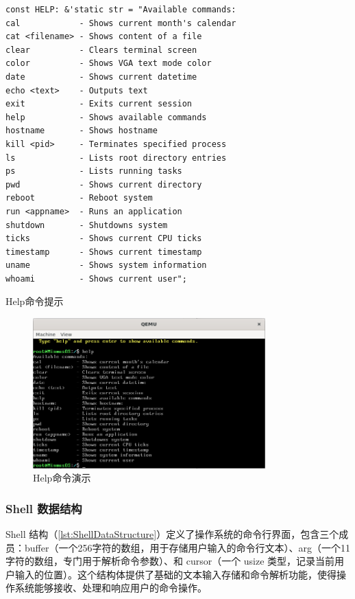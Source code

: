 \begin{listing}[htbp]
    \begin{verbatim}
const HELP: &'static str = "Available commands:
cal            - Shows current month's calendar
cat <filename> - Shows content of a file
clear          - Clears terminal screen
color          - Shows VGA text mode color
date           - Shows current datetime
echo <text>    - Outputs text
exit           - Exits current session
help           - Shows available commands
hostname       - Shows hostname
kill <pid>     - Terminates specified process
ls             - Lists root directory entries
ps             - Lists running tasks
pwd            - Shows current directory
reboot         - Reboot system
run <appname>  - Runs an application
shutdown       - Shutdowns system
ticks          - Shows current CPU ticks
timestamp      - Shows current timestamp
uname          - Shows system information
whoami         - Shows current user";
    \end{verbatim}
    \caption{Help命令提示}\label{lst:HelpCommandPrompt}
\end{listing}

\begin{figure}[htbp]
    \centering
    \includegraphics[width=0.8\textwidth]{figures/HelpCommandPresentation.png}
    \caption{Help命令演示}
    \label{fig:HelpCommandPresentation}
\end{figure}

\subsubsection{Shell 数据结构}

Shell 结构（\cref{lst:ShellDataStructure}）定义了操作系统的命令行界面，包含三个成员：buffer（一个256字符的数组，用于存储用户输入的命令行文本）、arg（一个11字符的数组，专门用于解析命令参数）、和 cursor（一个 usize 类型，记录当前用户输入的位置）。这个结构体提供了基础的文本输入存储和命令解析功能，使得操作系统能够接收、处理和响应用户的命令操作。

